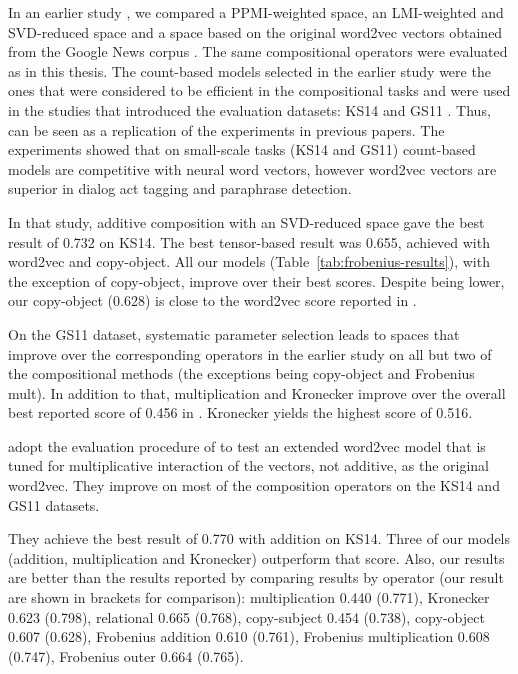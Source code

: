 In an earlier study \cite{milajevs-EtAl:2014:EMNLP2014}, we compared a PPMI-weighted space, an LMI-weighted and SVD-reduced space and a space based on the original word2vec vectors obtained from the Google News corpus \cite{mikolov2013distributed}. The same compositional operators were evaluated as in this thesis. The count-based models selected in the earlier study were the ones that were considered to be efficient in the compositional tasks and were used in the studies that introduced the evaluation datasets: KS14 \cite{kartsadrqpl2014} and GS11 \cite{Grefenstette:2011:ESC:2145432.2145580}. Thus,  can be seen as a replication of the experiments in previous papers. The experiments showed that on small-scale tasks (KS14 and GS11) count-based models are competitive with neural word vectors, however word2vec vectors are superior in dialog act tagging and paraphrase detection.

In that study, additive composition with an SVD-reduced space gave the best result of 0.732 on KS14. The best tensor-based result was 0.655, achieved with word2vec and copy-object. All our models (Table~\ref{tab:frobenius-results}), with the exception of copy-object, improve over their best scores. Despite being lower, our copy-object (0.628) is close to the word2vec score reported in .

On the GS11 dataset, systematic parameter selection leads to spaces that improve over the corresponding operators in the earlier study on all but two of the compositional methods (the exceptions being copy-object and Frobenius mult). In addition to that, multiplication and Kronecker improve over the overall best reported score of 0.456 in . Kronecker yields the highest score of 0.516.

 adopt the evaluation procedure of  to test an extended word2vec model that is tuned for multiplicative interaction of the vectors, not additive, as the original word2vec. They improve on most of the composition operators on the KS14 and GS11 datasets.

They achieve the best result of 0.770 with addition on KS14. Three of our models (addition, multiplication and Kronecker) outperform that score. Also, our results are better than the results reported  by comparing results by operator (our result are shown in brackets for comparison): multiplication 0.440 (0.771), Kronecker 0.623 (0.798), relational 0.665 (0.768), copy-subject 0.454 (0.738), copy-object 0.607 (0.628), Frobenius addition 0.610 (0.761), Frobenius multiplication 0.608 (0.747), Frobenius outer 0.664 (0.765).

